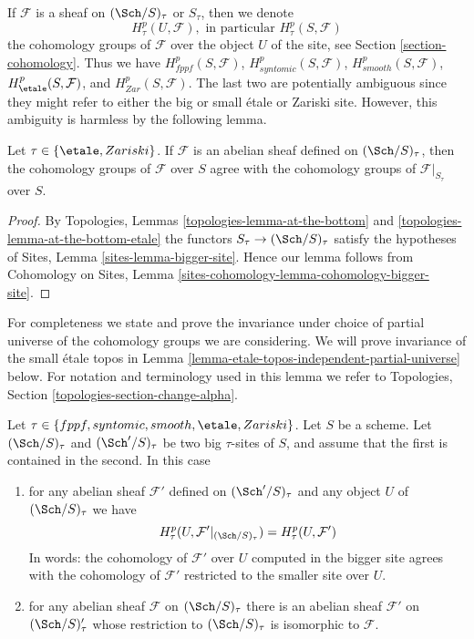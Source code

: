 \medskip\noindent
If $\mathcal{F}$ is a sheaf on $(\Sch/S)_\tau$ or $S_\tau$, then
we denote
$$
H^p_\tau(U, \mathcal{F}), \text{ in particular }
H^p_\tau(S, \mathcal{F})
$$
the cohomology groups of $\mathcal{F}$ over the object $U$ of the site, see
Section \ref{section-cohomology}. Thus we have
$H^p_{fppf}(S, \mathcal{F})$,
$H^p_{syntomic}(S, \mathcal{F})$,
$H^p_{smooth}(S, \mathcal{F})$,
$H^p_\etale(S, \mathcal{F})$, and
$H^p_{Zar}(S, \mathcal{F})$. The last two are potentially ambiguous since
they might refer to either the big or small \'etale or Zariski site. However,
this ambiguity is harmless by the following lemma.

\begin{lemma}
\label{lemma-compare-cohomology-big-small}
Let $\tau \in \{\etale, Zariski\}$.
If $\mathcal{F}$ is an abelian sheaf defined on
$(\Sch/S)_\tau$, then
the cohomology groups of $\mathcal{F}$ over $S$ agree with the cohomology
groups of $\mathcal{F}|_{S_\tau}$ over $S$.
\end{lemma}

\begin{proof}
By
Topologies, Lemmas \ref{topologies-lemma-at-the-bottom} and
\ref{topologies-lemma-at-the-bottom-etale}
the functors $S_\tau \to (\Sch/S)_\tau$
satisfy the hypotheses of
Sites, Lemma \ref{sites-lemma-bigger-site}.
Hence our lemma follows from
Cohomology on Sites, Lemma \ref{sites-cohomology-lemma-cohomology-bigger-site}.
\end{proof}

\noindent
For completeness we state and prove the invariance under choice of partial
universe of the cohomology groups we are considering. We will prove invariance
of the small \'etale topos in
Lemma \ref{lemma-etale-topos-independent-partial-universe} below.
For notation and terminology used in this lemma we refer to
Topologies, Section \ref{topologies-section-change-alpha}.

\begin{lemma}
\label{lemma-cohomology-enlarge-partial-universe}
Let $\tau \in \{fppf, syntomic, smooth, \etale, Zariski\}$.
Let $S$ be a scheme.
Let $(\Sch/S)_\tau$ and $(\Sch'/S)_\tau$ be two
big $\tau$-sites of $S$, and assume that the first is contained in the second.
In this case
\begin{enumerate}
\item for any abelian sheaf $\mathcal{F}'$ defined on $(\Sch'/S)_\tau$ and
any object $U$ of $(\Sch/S)_\tau$ we have
$$
H^p_\tau(U, \mathcal{F}'|_{(\Sch/S)_\tau}) =
H^p_\tau(U, \mathcal{F}')
$$
In words: the cohomology of $\mathcal{F}'$ over $U$ computed in the bigger site
agrees with the cohomology of $\mathcal{F}'$ restricted to the smaller site
over $U$.
\item for any abelian sheaf $\mathcal{F}$ on $(\Sch/S)_\tau$ there is an
abelian sheaf $\mathcal{F}'$ on $(\Sch/S)_\tau'$ whose restriction to
$(\Sch/S)_\tau$ is isomorphic to $\mathcal{F}$.
\end{enumerate}
\end{lemma}


